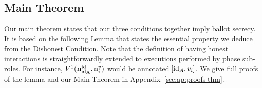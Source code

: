 


\subsection{Main Theorem}
\label{sec:proofs}
Our main theorem states that our three conditions together imply ballot secrecy.
It is based on the following Lemma that states  the essential property we deduce from the Dishonest Condition.
Note that the definition of having honest interactions is straightforwardly extended to executions
performed by phase sub-roles. For instance, $V^1({\mathbf{n^{\mathrm{id}}_{\mathrm{id}_A}}},{\mathbf{n}}^v_{i})$ would be annotated $[\mathrm{id}_A,v_i]$.
We give full proofs of the lemma and our Main Theorem
in Appendix~\ref{sec:ap:proofs-thm}.

